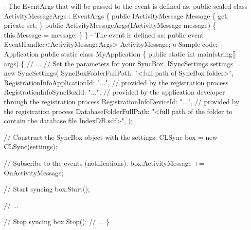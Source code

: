 \begin{DoxyCode}
    - The EventArgs that will be passed to the \textcolor{keyword}{event} is defined as:
          \textcolor{keyword}{public} sealed \textcolor{keyword}{class }ActivityMessageArgs : EventArgs
          \{
              \textcolor{keyword}{public} IActivityMessage Message \{ \textcolor{keyword}{get}; \textcolor{keyword}{private} \textcolor{keyword}{set}; \}
              \textcolor{keyword}{public} ActivityMessageArgs(IActivityMessage message)
              \{
                  this.Message = message;
              \}
          \}
    - The \textcolor{keyword}{event} is defined as:
          \textcolor{keyword}{public} \textcolor{keyword}{event} EventHandler<ActivityMessageArgs> ActivityMessage;
  o Sample code:
    - Application
      \textcolor{keyword}{public} \textcolor{keyword}{static} \textcolor{keyword}{class }MyApplication
      \{
          \textcolor{keyword}{public} \textcolor{keyword}{static} \textcolor{keywordtype}{int} main(\textcolor{keywordtype}{string}[] args)
          \{
              \textcolor{comment}{// ...}
              \textcolor{comment}{// Set the parameters for your SyncBox.}
              ISyncSettings settings = \textcolor{keyword}{new} SyncSettings(
                  SyncBoxFolderFullPath: \textcolor{stringliteral}{"<full path of SyncBox folder>"},
                  RegistrationInfoApplicationId: \textcolor{stringliteral}{"..."},   \textcolor{comment}{// provided by the registration process}
                  RegistrationInfoSyncBoxId: \textcolor{stringliteral}{"..."},       \textcolor{comment}{// provided by the application developer through
       the registration process}
                  RegistrationInfoDeviceId: \textcolor{stringliteral}{"..."},        \textcolor{comment}{// provided by the registration process}
                  DatabaseFolderFullPath: \textcolor{stringliteral}{"<full path of the folder to contain the database file
       IndexDB.sdf>"},
                   );
        
              \textcolor{comment}{// Construct the SyncBox object with the settings.}
              CLSync box = \textcolor{keyword}{new} CLSync(settings);

              \textcolor{comment}{// Subscribe to the events (notifications).}
              box.ActivityMessage += OnActivityMessage;
    
              \textcolor{comment}{// Start syncing}
              box.Start(); 
    
              \textcolor{comment}{// ...}
    
              \textcolor{comment}{// Stop syncing}
              box.Stop();
              \textcolor{comment}{// ...}
          \}


\end{DoxyCode}
